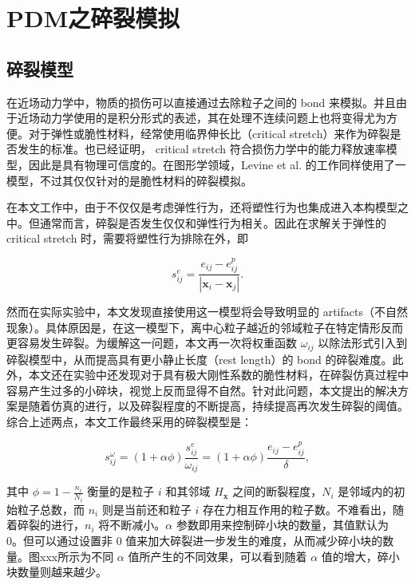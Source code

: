 ﻿\chapter{PDM之碎裂模拟}
\section{碎裂模型}
在近场动力学中，物质的损伤可以直接通过去除粒子之间的 bond 来模拟。并且由于近场动力学使用的是积分形式的表述，其在处理不连续问题上也将变得尤为方便。对于弹性或脆性材料，经常使用临界伸长比（critical stretch）来作为碎裂是否发生的标准。也已经证明， critical stretch 符合损伤力学中的能力释放速率模型，因此是具有物理可信度的。在图形学领域，Levine et al. 的工作同样使用了一模型，不过其仅仅针对的是脆性材料的碎裂模拟。

在本文工作中，由于不仅仅是考虑弹性行为，还将塑性行为也集成进入本构模型之中。但通常而言，碎裂是否发生仅仅和弹性行为相关。因此在求解关于弹性的 critical stretch 时，需要将塑性行为排除在外，即

\begin{equation}
s_{ij}^e =\frac{e_{ij}-e_{ij}^p}{|\mathbf{x}_i-\mathbf{x}_j|}.
\end{equation}

然而在实际实验中，本文发现直接使用这一模型将会导致明显的 artifacts（不自然现象）。具体原因是，在这一模型下，离中心粒子越近的邻域粒子在特定情形反而更容易发生碎裂。为缓解这一问题，本文再一次将权重函数 $\omega_{ij}$ 以除法形式引入到碎裂模型中，从而提高具有更小静止长度（rest length）的 bond 的碎裂难度。此外，本文还在实验中还发现对于具有极大刚性系数的脆性材料，在碎裂仿真过程中容易产生过多的小碎块，视觉上反而显得不自然。针对此问题，本文提出的解决方案是随着仿真的进行，以及碎裂程度的不断提高，持续提高再次发生碎裂的阈值。综合上述两点，本文工作最终采用的碎裂模型是：

\begin{equation}
s_{ij}^\omega = (1 + \alpha\phi)\frac{s_{ij}^e}{\omega_{ij}} = (1 + \alpha\phi)\frac{e_{ij}-e_{ij}^p}{\delta},
\end{equation}

其中 $\phi = 1 - \frac{n_i}{N_i}$ 衡量的是粒子 $i$ 和其邻域 $H_\mathbf{x}$ 之间的断裂程度，$N_i$ 是邻域内的初始粒子总数，而 $n_i$ 则是当前还和粒子 $i$ 存在力相互作用的粒子数。不难看出，随着碎裂的进行，$n_i$ 将不断减小。$\alpha$ 参数即用来控制碎小块的数量，其值默认为 0。但可以通过设置非 0 值来加大碎裂进一步发生的难度，从而减少碎小块的数量。图xxx所示为不同 $\alpha$ 值所产生的不同效果，可以看到随着 $\alpha$ 值的增大，碎小块数量则越来越少。

